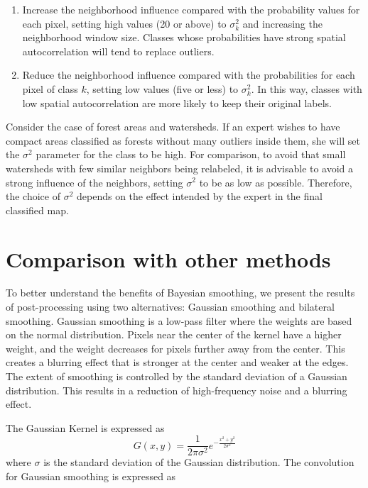 \documentclass[
  shortnames]{jss}
\begin{document}
\begin{enumerate}
\def\labelenumi{\arabic{enumi}.}
\item
  Increase the neighborhood influence compared with the probability values for each pixel, setting high values (20 or above) to \(\sigma^2_{k}\) and increasing the neighborhood window size. Classes whose probabilities have strong spatial autocorrelation will tend to replace outliers.
\item
  Reduce the neighborhood influence compared with the probabilities for each pixel of class \(k\), setting low values (five or less) to \(\sigma^2_{k}\). In this way, classes with low spatial autocorrelation are more likely to keep their original labels.
\end{enumerate}

Consider the case of forest areas and watersheds. If an expert wishes to have compact areas classified as forests without many outliers inside them, she will set the \(\sigma^2\) parameter for the class  to be high. For comparison, to avoid that small watersheds with few similar neighbors being relabeled, it is advisable to avoid a strong influence of the neighbors, setting \(\sigma^2\) to be as low as possible. Therefore, the choice of \(\sigma^2\) depends on the effect intended by the expert in the final classified map.

\section{Comparison with other methods}\label{comparison-with-other-methods}

To better understand the benefits of Bayesian smoothing, we present the results of post-processing using two alternatives: Gaussian smoothing and bilateral smoothing. Gaussian smoothing is a low-pass filter where the weights are based on the normal distribution. Pixels near the center of the kernel have a higher weight, and the weight decreases for pixels further away from the center. This creates a blurring effect that is stronger at the center and weaker at the edges. The extent of smoothing is controlled by the standard deviation of a Gaussian distribution. This results in a reduction of high-frequency noise and a blurring effect.

The Gaussian Kernel is expressed as
\begin{equation}
   G(x, y) = \frac{1}{2\pi\sigma^2} e^{-\frac{x^2 + y^2}{2\sigma^2}}
\end{equation}
where \(\sigma\) is the standard deviation of the Gaussian distribution. The convolution for Gaussian smoothing is expressed as
\end{document}
